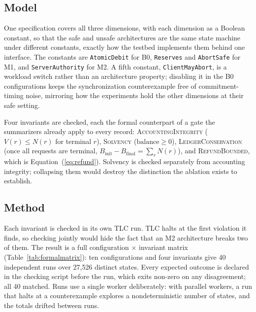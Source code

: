 \documentclass[manuscript,review]{acmart}
\begin{document}
\subsection{Model}
One specification covers all three dimensions, with each dimension as a Boolean constant,
so that the safe and unsafe architectures are the same state machine under different
constants, exactly how the testbed implements them behind one interface. The constants
are \texttt{AtomicDebit} for B0, \texttt{Reserves} and \texttt{AbortSafe} for M1, and
\texttt{ServerAuthority} for M2. A fifth constant, \texttt{ClientMayAbort}, is a workload
switch rather than an architecture property; disabling it in the B0 configurations keeps
the synchronization counterexample free of commitment-timing noise, mirroring how the
experiments hold the other dimensions at their safe setting.

Four invariants are checked, each the formal counterpart of a gate the summarizers
already apply to every record: \textsc{AccountingIntegrity} ($V(r) \le N(r)$ for terminal
$r$), \textsc{Solvency} ($\mathrm{balance} \ge 0$), \textsc{LedgerConservation} (once all
requests are terminal, $B_{\mathrm{init}} - B_{\mathrm{final}} = \sum_r N(r)$), and
\textsc{RefundBounded}, which is Equation~(\ref{eq:refund}). Solvency is checked
separately from accounting integrity; collapsing them would destroy the distinction the
ablation exists to establish.

\subsection{Method}
Each invariant is checked in its own TLC run. TLC halts at the first violation it finds,
so checking jointly would hide the fact that an M2 architecture breaks two of them. The
result is a full configuration $\times$ invariant matrix (Table~\ref{tab:formalmatrix}):
ten configurations and four invariants give 40 independent runs over 27{,}526 distinct
states. Every expected outcome is declared in the checking script before the run, which exits
non-zero on any disagreement; all 40 matched. Runs
use a single worker deliberately: with parallel workers, a run that halts at a
counterexample explores a nondeterministic number of states, and the totals drifted
between runs.
\end{document}
